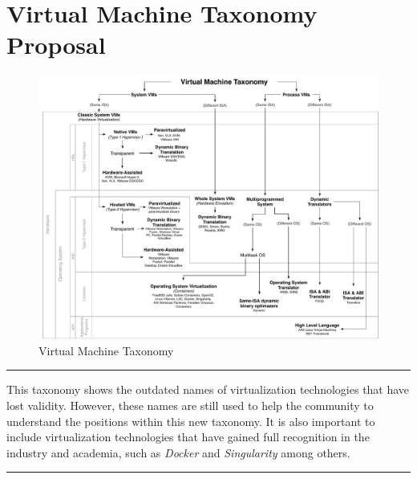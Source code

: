 	\section {Virtual Machine Taxonomy Proposal} \label{sec:taxonomiaPropuesta}
	
	\begin{figure}[ht]
		\centering
		\includegraphics[width=17cm]{images/virtualMachineTaxonomy.pdf}
		\vspace{-0.2cm}%
		\caption{Virtual Machine Taxonomy }%
    	\label{fig:TaxonomiaPropuesta}
	\end{figure}
	
	\noindent\rule{8.5cm}{0.4pt}
	\vspace{1mm}
	\parbox[c]{8.5cm}{ \footnotesize This taxonomy shows the outdated names of virtualization technologies that have lost validity. However, these names are still used to help the community to understand the positions within this new taxonomy. It is also important to include virtualization technologies that have gained full recognition in the industry and academia, such as \textit{Docker} and \textit{Singularity} among others.}
    \noindent\rule{8.5cm}{0.4pt}
    
    
	

